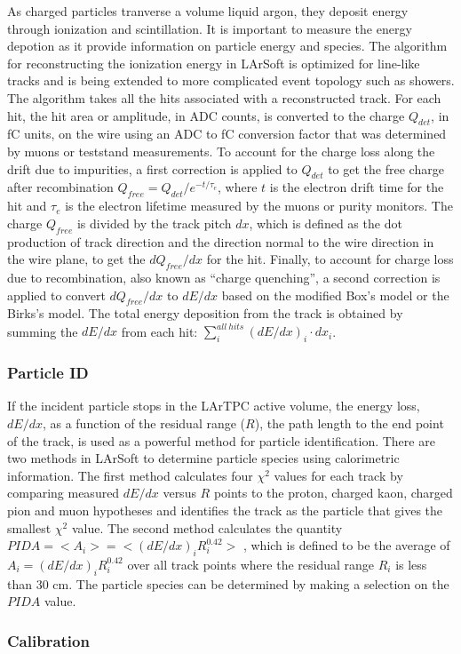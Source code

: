 As charged particles tranverse a volume liquid argon, they deposit
energy through ionization and scintillation. It is important to
measure the energy depotion as it provide information on particle
energy and species. The algorithm for reconstructing the ionization
energy in LArSoft is optimized for line-like tracks and is being
extended to more complicated event topology such as showers. The
algorithm takes all the hits associated with a reconstructed
track. For each hit, the hit area or amplitude, in ADC counts, is
converted to the charge $Q_{det}$, in fC units, on the wire using an
ADC to fC conversion factor that was determined by muons or teststand
measurements. To account for the charge loss along the drift due to
impurities, a first correction is applied to $Q_{det}$ to get the free
charge after recombination $Q_{free} = Q_{det}/e^{-t/\tau_{e}}$, where
$t$ is the electron drift time for the hit and $\tau_{e}$ is the
electron lifetime measured by the muons or purity monitors. The charge
$Q_{free}$ is divided by the track pitch $dx$, which is defined as the
dot production of track direction and the direction normal to the wire
direction in the wire plane, to get the $dQ_{free}/dx$ for the
hit. Finally, to account for charge loss due to recombination, also
known as ``charge quenching'', a second correction is applied to
convert $dQ_{free}/dx$ to $dE/dx$ based on the modified Box's model
\cite{box} or the Birks's model\cite{birks}. The total energy
deposition from the track is obtained by summing the $dE/dx$ from each
hit: $\sum\limits_{i}^{all\ hits}(dE/dx)_{i}\cdot dx_{i}$.


\subsubsection{Particle ID}


If the incident particle stops in the LArTPC active volume, the energy
loss, $dE/dx$, as a function of the residual range ($R$), the path
length to the end point of the track, is used as a powerful method for
particle identification. There are two methods in LArSoft to determine
particle species using calorimetric information. The first method
calculates four $\chi^{2}$ values for each track by comparing measured
$dE/dx$ versus $R$ points to the proton, charged kaon, charged pion
and muon hypotheses and identifies the track as the particle that
gives the smallest $\chi^{2}$ value. The second method calculates the
quantity $PIDA = <A_{i}> = <(dE/dx)_{i}R_{i}^{0.42}>$ \cite{box},
which is defined to be the average of $A_{i} =
(dE/dx)_{i}R_{i}^{0.42}$ over all track points where the residual
range $R_{i}$ is less than 30 cm. The particle species can be
determined by making a selection on the $PIDA$ value.

\subsubsection{Calibration}




